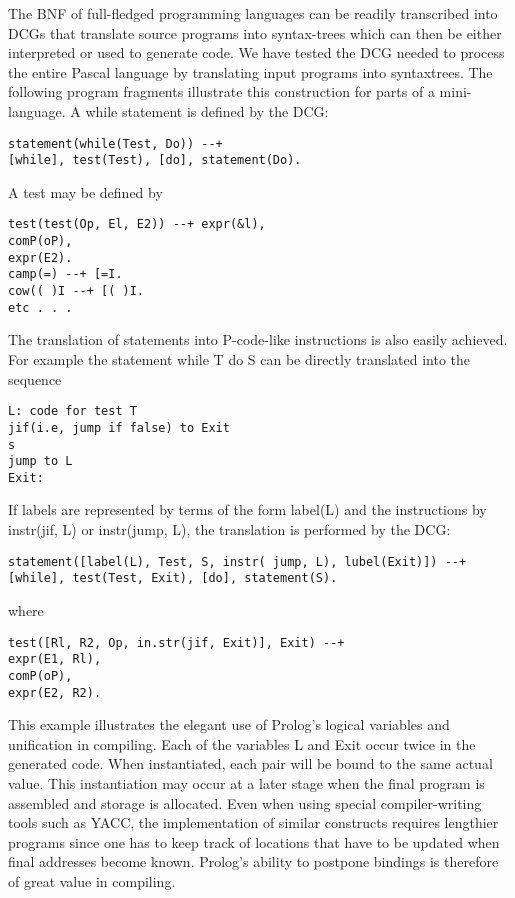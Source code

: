 The BNF of full-fledged programming languages can be readily transcribed
into DCGs that translate source programs into syntax-trees which can then be
either interpreted or used to generate code. We have tested the DCG needed to
process the entire Pascal language by translating input programs into syntaxtrees.
The following program fragments illustrate this construction for parts of a
mini-language. A while statement is defined by the DCG: 
\begin{verbatim}
statement(while(Test, Do)) --+
[while], test(Test), [do], statement(Do).
\end{verbatim}
A test may be defined by
\begin{verbatim}
test(test(Op, El, E2)) --+ expr(&l),
comP(oP),
expr(E2).
camp(=) --+ [=I.
cow(( )I --+ [( )I.
etc . . .  
\end{verbatim}
The translation of statements into P-code-like instructions is also easily achieved.
For example the statement while T do S can be directly translated into the
sequence
\begin{verbatim}
L: code for test T
jif(i.e, jump if false) to Exit
s
jump to L
Exit:       
\end{verbatim}
If labels are represented by terms of the form label(L) and the instructions by
instr(jif, L) or instr(jump, L), the translation is performed by the DCG:
\begin{verbatim}
statement([label(L), Test, S, instr( jump, L), lubel(Exit)]) --+
[while], test(Test, Exit), [do], statement(S). 
\end{verbatim}
where
\begin{verbatim}
test([Rl, R2, Op, in.str(jif, Exit)], Exit) --+
expr(E1, Rl),
comP(oP),
expr(E2, R2). 
\end{verbatim}
This example illustrates the elegant use of Prolog’s logical variables and unification
in compiling. Each of the variables L and Exit occur twice in the generated
code. When instantiated, each pair will be bound to the same actual value. This
instantiation may occur at a later stage when the final program is assembled and
storage is allocated. Even when using special compiler-writing tools such as
YACC, the implementation of similar constructs requires lengthier programs
since one has to keep track of locations that have to be updated when final
addresses become known. Prolog’s ability to postpone bindings is therefore of
great value in compiling. 

